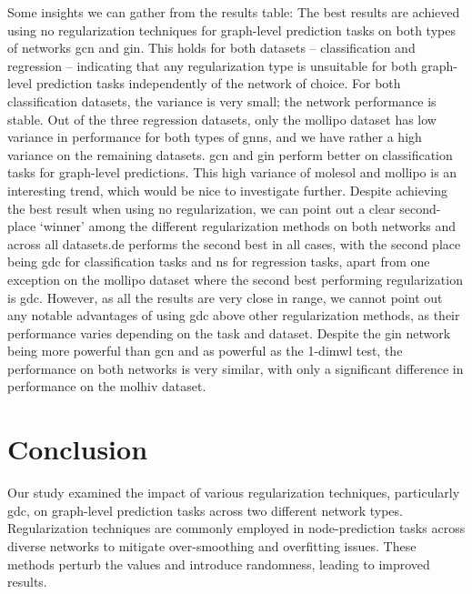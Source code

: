 Some insights we can gather from the results table:
The best results are achieved using no regularization techniques for graph-level prediction tasks on both types of networks \ac{gcn} and \ac{gin}. This holds for both datasets -- classification and regression -- indicating that any regularization type is unsuitable for both graph-level prediction tasks independently of the network of choice.
For both classification datasets, the variance is very small; the network performance is stable. Out of the three regression datasets, only the mollipo dataset has low variance in performance for both types of \acp{gnn}, and we have rather a high variance on the remaining datasets. \ac{gcn} and \ac{gin} perform better on classification tasks for graph-level predictions. This high variance of molesol and mollipo is an interesting trend, which would be nice to investigate further.
Despite achieving the best result when using no regularization, we can point out a clear second-place `winner' among the different regularization methods on both networks and across all datasets.\ac{de} performs the second best in all cases, with the second place being \ac{gdc} for classification tasks and \ac{ns} for regression tasks, apart from one exception on the mollipo dataset where the second best performing regularization is \ac{gdc}. However, as all the results are very close in range, we cannot point out any notable advantages of using \ac{gdc} above other regularization methods, as their performance varies depending on the task and dataset.
Despite the \ac{gin} network being more powerful than \ac{gcn} and as powerful as the 1-dim\ac{wl} test, the performance on both networks is very similar, with only a significant difference in performance on the molhiv dataset.

\section{Conclusion}

Our study examined the impact of various regularization techniques, particularly \ac{gdc}, on graph-level prediction tasks across two different network types. Regularization techniques are commonly employed in node-prediction tasks across diverse networks to mitigate over-smoothing and overfitting issues. These methods perturb the values and introduce randomness, leading to improved results.

